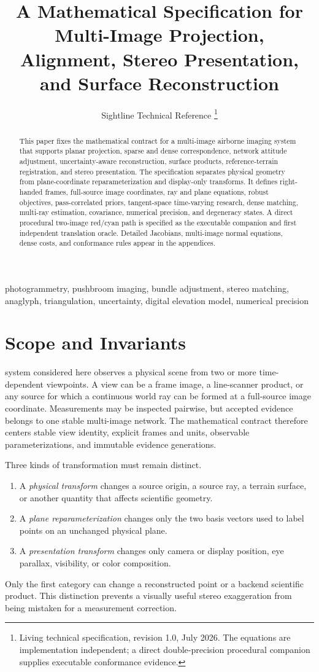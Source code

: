\documentclass[journal]{IEEEtran}
\title{A Mathematical Specification for Multi-Image Projection, Alignment, Stereo Presentation, and Surface Reconstruction}
\author{Sightline Technical Reference%
\thanks{Living technical specification, revision 1.0, July 2026. The equations are implementation independent; a direct double-precision procedural companion supplies executable conformance evidence.}}
\begin{document}
\maketitle

\begin{abstract}
This paper fixes the mathematical contract for a multi-image airborne imaging
system that supports planar projection, sparse and dense correspondence,
network attitude adjustment, uncertainty-aware reconstruction, surface
products, reference-terrain registration, and stereo presentation. The
specification separates physical geometry from plane-coordinate
reparameterization and display-only transforms. It defines right-handed frames,
full-source image coordinates, ray and plane equations, robust objectives,
pass-correlated priors, tangent-space time-varying research, dense matching,
multi-ray estimation, covariance, numerical precision, and degeneracy states.
A direct procedural two-image red/cyan path is specified as the executable
companion and first independent translation oracle. Detailed Jacobians,
multi-image normal equations, dense costs, and conformance rules appear in the
appendices.
\end{abstract}

\begin{IEEEkeywords}
photogrammetry, pushbroom imaging, bundle adjustment, stereo matching,
anaglyph, triangulation, uncertainty, digital elevation model, numerical
precision
\end{IEEEkeywords}

\section{Scope and Invariants}

 system considered here observes a physical scene from two
or more time-dependent viewpoints. A view can be a frame image, a line-scanner
product, or any source for which a continuous world ray can be formed at a
full-source image coordinate. Measurements may be inspected pairwise, but
accepted evidence belongs to one stable multi-image network. The mathematical
contract therefore centers stable view identity, explicit frames and units,
observable parameterizations, and immutable evidence generations.

Three kinds of transformation must remain distinct.
\begin{enumerate}
\item A \emph{physical transform} changes a source origin, a source ray, a
      terrain surface, or another quantity that affects scientific geometry.
\item A \emph{plane reparameterization} changes only the two basis vectors used
      to label points on an unchanged physical plane.
\item A \emph{presentation transform} changes only camera or display position,
      eye parallax, visibility, or color composition.
\end{enumerate}
Only the first category can change a reconstructed point or a backend scientific
product. This distinction prevents a visually useful stereo exaggeration from
being mistaken for a measurement correction.
\end{document}
